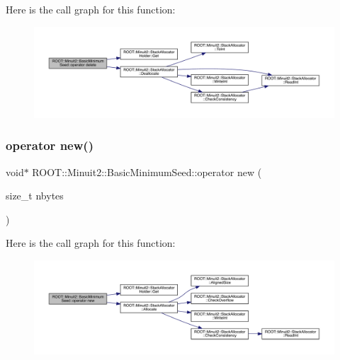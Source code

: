 Here is the call graph for this function\+:
\nopagebreak
\begin{figure}[H]
\begin{center}
\leavevmode
\includegraphics[width=350pt]{de/d50/classROOT_1_1Minuit2_1_1BasicMinimumSeed_ae2af98f9f03cfe5e5202153b914ff120_cgraph}
\end{center}
\end{figure}
\mbox{\label{classROOT_1_1Minuit2_1_1BasicMinimumSeed_ae9ee17ec0140aa209e488b064675f3c3}} 
\subsubsection{\texorpdfstring{operator new()}{operator new()}\hspace{0.1cm}{\footnotesize\ttfamily [1/2]}}
{\footnotesize\ttfamily void$\ast$ R\+O\+O\+T\+::\+Minuit2\+::\+Basic\+Minimum\+Seed\+::operator new (\begin{DoxyParamCaption}\item[{size\+\_\+t}]{nbytes }\end{DoxyParamCaption})\hspace{0.3cm}{\ttfamily [inline]}}

Here is the call graph for this function\+:
\nopagebreak
\begin{figure}[H]
\begin{center}
\leavevmode
\includegraphics[width=350pt]{de/d50/classROOT_1_1Minuit2_1_1BasicMinimumSeed_ae9ee17ec0140aa209e488b064675f3c3_cgraph}
\end{center}
\end{figure}
\mbox{\label{classROOT_1_1Minuit2_1_1BasicMinimumSeed_ae9ee17ec0140aa209e488b064675f3c3}} 
